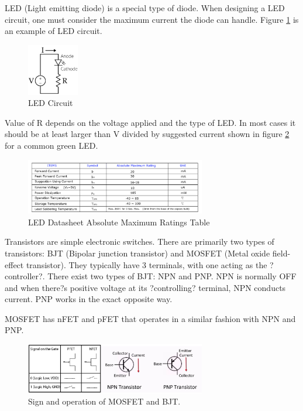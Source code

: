 \documentclass{article}
\begin{document}
LED (Light emitting diode) is a special type of diode. When designing a LED circuit, one must consider the maximum current the diode can handle. Figure \ref{fig:LEDcct} is an example of LED circuit. 

\begin{figure}[!h]
	\center
	\includegraphics[width=0.2\textwidth, keepaspectratio]{LEDcct}
	\caption{LED Circuit}
	\label{fig:LEDcct}
\end{figure}

Value of R depends on the voltage applied and the type of LED. In most cases it should be at least larger than V divided by suggested current shown in figure \ref{fig:LEDds} for a common green LED. 

\begin{figure}[!h]
	\center
	\includegraphics[width=0.7\textwidth, keepaspectratio]{LEDds}
	\caption{LED Datasheet Absolute Maximum Ratings Table}
	\label{fig:LEDds}
\end{figure}

Transistors are simple electronic switches. There are primarily two types of transistors: BJT (Bipolar junction transistor) and MOSFET (Metal oxide field-effect transistor). They typically have 3 terminals, with one acting as the ?controller?. There exist two types of BJT: NPN and PNP. NPN is normally OFF and when there?s positive voltage at its ?controlling? terminal, NPN conducts current. PNP works in the exact opposite way. \par
MOSFET has nFET and pFET that operates in a similar fashion with NPN and PNP.

\begin{figure}[!h]
	\center
	\includegraphics[width=0.7\textwidth, keepaspectratio]{transistor}
	\caption{Sign and operation of MOSFET and BJT.}
	\label{fig:transistor}
\end{figure}
\end{document}
